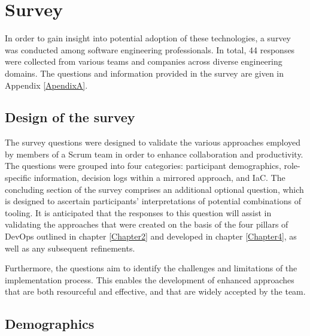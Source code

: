 

\chapter{Survey}

\label{Chapter5} %

In order to gain insight into potential adoption of these technologies, a survey was conducted among software engineering professionals. In total, 44 responses were collected from various teams and companies across diverse engineering domains. 
The questions and information provided in the survey are given in Appendix \ref{ApendixA}.

\section{Design of the survey}
The survey questions were designed to validate the various approaches employed by members of a Scrum team in order to enhance collaboration and productivity. The questions were grouped into four categories: participant demographics, role-specific information, decision logs within a mirrored approach, and \ac{IaC}. The concluding section of the survey comprises an additional optional question, which is designed to ascertain participants’ interpretations of potential combinations of tooling. It is anticipated that the responses to this question will assist in validating the approaches that were created on the basis of the four pillars of \ac{DevOps} outlined in chapter \ref{Chapter2} and developed in chapter \ref{Chapter4}, as well as any subsequent refinements. 

Furthermore, the questions aim to identify the challenges and limitations of the implementation process. This enables the development of enhanced approaches that are both resourceful and effective, and that are widely accepted by the team.


\pagebreak

\section{Demographics}


